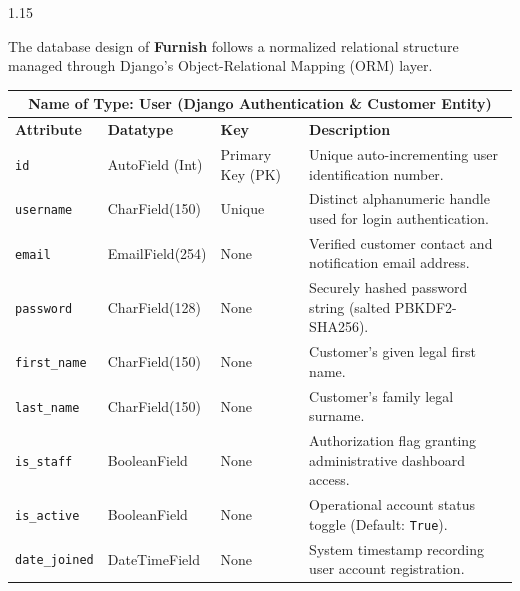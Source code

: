 \documentclass[12pt,a4paper]{article}
\begin{document}
{\fontsize{13}{18}\selectfont
\begin{spacing}{1.15}

\noindent
The database design of \textbf{Furnish} follows a normalized relational structure managed through Django's Object-Relational Mapping (ORM) layer.

\vspace{0.05in}

\begin{center}
\renewcommand{\arraystretch}{1.15}
\fontsize{9}{12}\selectfont
\begin{tabular}{|p{1.4in}|p{1.1in}|p{0.8in}|p{2.9in}|}
\hline
\multicolumn{4}{|c|}{\textbf{\fontsize{10}{13}\selectfont Name of Type: User (Django Authentication \& Customer Entity)}} \\ \hline
\textbf{Attribute} & \textbf{Datatype} & \textbf{Key} & \textbf{Description} \\ \hline
\texttt{id} & AutoField (Int) & Primary Key (PK) & Unique auto-incrementing user identification number. \\ \hline
\texttt{username} & CharField(150) & Unique & Distinct alphanumeric handle used for login authentication. \\ \hline
\texttt{email} & EmailField(254) & None & Verified customer contact and notification email address. \\ \hline
\texttt{password} & CharField(128) & None & Securely hashed password string (salted PBKDF2-SHA256). \\ \hline
\texttt{first\_name} & CharField(150) & None & Customer's given legal first name. \\ \hline
\texttt{last\_name} & CharField(150) & None & Customer's family legal surname. \\ \hline
\texttt{is\_staff} & BooleanField & None & Authorization flag granting administrative dashboard access. \\ \hline
\texttt{is\_active} & BooleanField & None & Operational account status toggle (Default: \texttt{True}). \\ \hline
\texttt{date\_joined} & DateTimeField & None & System timestamp recording user account registration. \\ \hline
\end{tabular}
\end{center}

\vspace{0.05in}


\end{spacing}}
\end{document}

